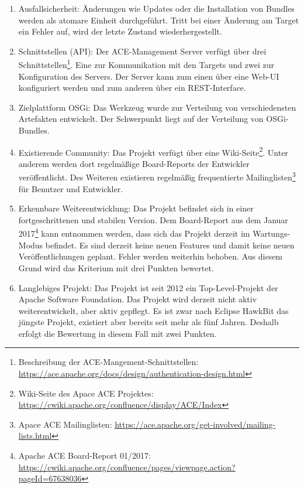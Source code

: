 \begin{enumerate}[label={Nr. \arabic*}, leftmargin=*, labelindent=1em]
 \item Ausfallsicherheit:
 Änderungen wie Updates oder die Installation von Bundles werden als atomare Einheit durchgeführt. Tritt bei einer Änderung am Target ein Fehler auf, wird der letzte 
 Zustand wiederhergestellt.
 
 \item Schnittstellen (\ac{API}):
 Der ACE-Management Server verfügt über drei Schnittstellen\footnote{Beschreibung der ACE-Mangement-Schnittstellen: \url{https://ace.apache.org/docs/design/authentication-design.html}}.
 Eine zur Kommunikation mit den Targets und zwei zur Konfiguration des Servers. Der Server kann zum einen über eine Web-UI konfiguriert werden und zum anderen über ein REST-Interface.
 
 \item Zielplattform \ac{OSGi}: Das Werkzeug wurde zur Verteilung von verschiedensten Artefakten entwickelt. Der Schwerpunkt liegt auf der Verteilung von \ac{OSGi}-Bundles.
 
 \item Existierende Community:
 Das Projekt verfügt über eine Wiki-Seite\footnote{Wiki-Seite des Apace ACE Projektes: \url{https://cwiki.apache.org/confluence/display/ACE/Index}}.
 Unter anderem werden dort regelmäßige Board-Reports der Entwickler veröffentlicht.
 Des Weiteren existieren regelmäßig frequentierte Mailinglisten\footnote{Apace ACE Mailinglisten: \url{https://ace.apache.org/get-involved/mailing-lists.html}} für Benutzer und Entwickler.
 
 \item Erkennbare Weiterentwicklung:
 Das Projekt befindet sich in einer fortgeschrittenen und stabilen Version. 
 Dem Board-Report aus dem Januar 2017\footnote{Apache ACE Board-Report 01/2017: \url{https://cwiki.apache.org/confluence/pages/viewpage.action?pageId=67638036}}
 kann entnommen werden, dass sich das Projekt derzeit im Wartungs-Modus befindet. Es sind derzeit keine neuen Features und damit keine neuen Veröffentlichungen 
 geplant. Fehler werden weiterhin behoben. Aus diesem Grund wird das Kriterium mit drei Punkten bewertet.
 
 \item Langlebiges Projekt:
 Das Projekt ist seit 2012 ein Top-Level-Projekt der Apache Software Foundation. Das Projekt wird derzeit nicht aktiv weiterentwickelt, aber aktiv gepflegt.
 Es ist zwar nach Eclipse HawkBit das jüngste Projekt, existiert aber bereits seit mehr als fünf Jahren. Deshalb erfolgt die Bewertung in diesem Fall mit zwei Punkten.
 

\end{enumerate}
